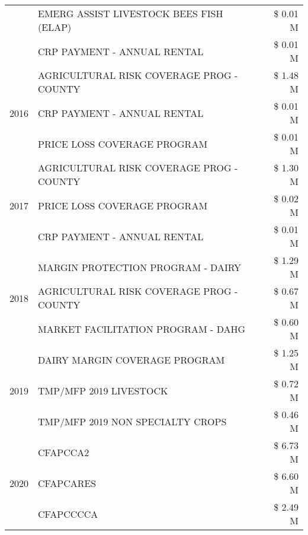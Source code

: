 \begin{tabular}{llr}
 & EMERG ASSIST LIVESTOCK BEES FISH (ELAP) & \$ 0.01 M \\
 & CRP PAYMENT - ANNUAL RENTAL & \$ 0.01 M \\
\cline{1-3}
\multirow[t]{3}{*}{2016} & AGRICULTURAL RISK COVERAGE PROG - COUNTY & \$ 1.48 M \\
 & CRP PAYMENT - ANNUAL RENTAL & \$ 0.01 M \\
 & PRICE LOSS COVERAGE PROGRAM & \$ 0.01 M \\
\cline{1-3}
\multirow[t]{3}{*}{2017} & AGRICULTURAL RISK COVERAGE PROG - COUNTY & \$ 1.30 M \\
 & PRICE LOSS COVERAGE PROGRAM & \$ 0.02 M \\
 & CRP PAYMENT - ANNUAL RENTAL & \$ 0.01 M \\
\cline{1-3}
\multirow[t]{3}{*}{2018} & MARGIN PROTECTION PROGRAM - DAIRY & \$ 1.29 M \\
 & AGRICULTURAL RISK COVERAGE PROG - COUNTY & \$ 0.67 M \\
 & MARKET FACILITATION PROGRAM - DAHG & \$ 0.60 M \\
\cline{1-3}
\multirow[t]{3}{*}{2019} & DAIRY MARGIN COVERAGE PROGRAM & \$ 1.25 M \\
 & TMP/MFP 2019 LIVESTOCK & \$ 0.72 M \\
 & TMP/MFP 2019 NON SPECIALTY CROPS & \$ 0.46 M \\
\cline{1-3}
\multirow[t]{3}{*}{2020} & CFAPCCA2 & \$ 6.73 M \\
 & CFAPCARES & \$ 6.60 M \\
 & CFAPCCCCA & \$ 2.49 M \\
\cline{1-3}
\bottomrule
\end{tabular}
